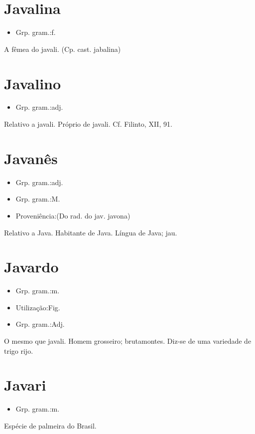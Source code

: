 \documentclass{article}
\begin{document}
\section{Javalina}
\begin{itemize}
\item {Grp. gram.:f.}
\end{itemize}
A fêmea do javali.
(Cp. cast. \textunderscore jabalina\textunderscore )
\section{Javalino}
\begin{itemize}
\item {Grp. gram.:adj.}
\end{itemize}
Relativo a javali.
Próprio de javali. Cf. Filinto, XII, 91.
\section{Javanês}
\begin{itemize}
\item {Grp. gram.:adj.}
\end{itemize}
\begin{itemize}
\item {Grp. gram.:M.}
\end{itemize}
\begin{itemize}
\item {Proveniência:(Do rad. do jav. \textunderscore javona\textunderscore )}
\end{itemize}
Relativo a Java.
Habitante de Java.
Língua de Java; jau.
\section{Javardo}
\begin{itemize}
\item {Grp. gram.:m.}
\end{itemize}
\begin{itemize}
\item {Utilização:Fig.}
\end{itemize}
\begin{itemize}
\item {Grp. gram.:Adj.}
\end{itemize}
O mesmo que \textunderscore javali\textunderscore .
Homem grosseiro; brutamontes.
Diz-se de uma variedade de trigo rijo.
\section{Javari}
\begin{itemize}
\item {Grp. gram.:m.}
\end{itemize}
Espécie de palmeira do Brasil.
\end{document}
